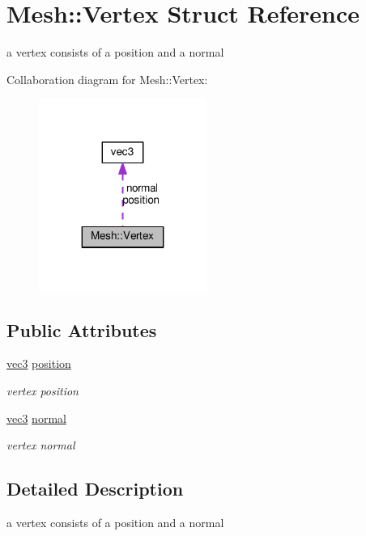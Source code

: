 \hypertarget{structMesh_1_1Vertex}{}\section{Mesh\+:\+:Vertex Struct Reference}
\label{structMesh_1_1Vertex}


a vertex consists of a position and a normal  




Collaboration diagram for Mesh\+:\+:Vertex\+:
\nopagebreak
\begin{figure}[H]
\begin{center}
\leavevmode
\includegraphics[width=155pt]{structMesh_1_1Vertex__coll__graph}
\end{center}
\end{figure}
\subsection*{Public Attributes}
\begin{DoxyCompactItemize}
\item 
\hyperlink{classvec3}{vec3} \hyperlink{structMesh_1_1Vertex_a6ee1c5ba29f0bf02bf446845de25548f}{position}
\begin{DoxyCompactList}\small\item\em vertex position \end{DoxyCompactList}\item 
\hyperlink{classvec3}{vec3} \hyperlink{structMesh_1_1Vertex_adf43225146648954d9196e4b6fa47379}{normal}
\begin{DoxyCompactList}\small\item\em vertex normal \end{DoxyCompactList}\end{DoxyCompactItemize}


\subsection{Detailed Description}
a vertex consists of a position and a normal 

